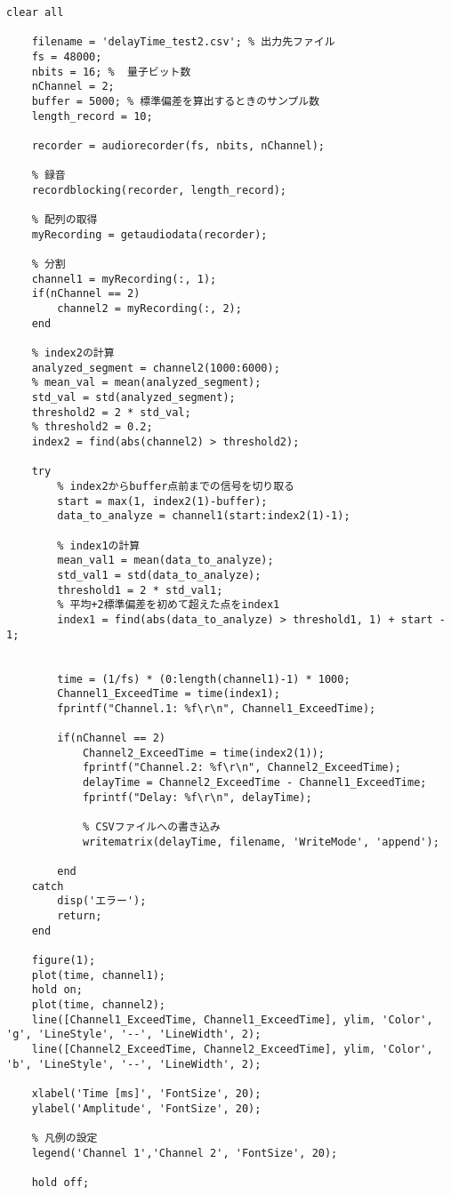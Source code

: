 \begin{lstlisting}[caption=MeasureDelayTime.m]
    clear all

    filename = 'delayTime_test2.csv'; % 出力先ファイル
    fs = 48000; 
    nbits = 16; %  量子ビット数
    nChannel = 2; 
    buffer = 5000; % 標準偏差を算出するときのサンプル数
    length_record = 10; 

    recorder = audiorecorder(fs, nbits, nChannel);

    % 録音
    recordblocking(recorder, length_record); 

    % 配列の取得
    myRecording = getaudiodata(recorder);

    % 分割
    channel1 = myRecording(:, 1);
    if(nChannel == 2)
        channel2 = myRecording(:, 2);
    end

    % index2の計算
    analyzed_segment = channel2(1000:6000);
    % mean_val = mean(analyzed_segment);
    std_val = std(analyzed_segment);
    threshold2 = 2 * std_val;
    % threshold2 = 0.2;
    index2 = find(abs(channel2) > threshold2); 

    try
        % index2からbuffer点前までの信号を切り取る
        start = max(1, index2(1)-buffer);  
        data_to_analyze = channel1(start:index2(1)-1);

        % index1の計算
        mean_val1 = mean(data_to_analyze);
        std_val1 = std(data_to_analyze);
        threshold1 = 2 * std_val1;
        % 平均+2標準偏差を初めて超えた点をindex1
        index1 = find(abs(data_to_analyze) > threshold1, 1) + start - 1;

        
        time = (1/fs) * (0:length(channel1)-1) * 1000;
        Channel1_ExceedTime = time(index1);
        fprintf("Channel.1: %f\r\n", Channel1_ExceedTime);

        if(nChannel == 2)
            Channel2_ExceedTime = time(index2(1));
            fprintf("Channel.2: %f\r\n", Channel2_ExceedTime);
            delayTime = Channel2_ExceedTime - Channel1_ExceedTime;
            fprintf("Delay: %f\r\n", delayTime);

            % CSVファイルへの書き込み
            writematrix(delayTime, filename, 'WriteMode', 'append');

        end
    catch
        disp('エラー');
        return;
    end

    figure(1); 
    plot(time, channel1);
    hold on;
    plot(time, channel2);
    line([Channel1_ExceedTime, Channel1_ExceedTime], ylim, 'Color', 'g', 'LineStyle', '--', 'LineWidth', 2);
    line([Channel2_ExceedTime, Channel2_ExceedTime], ylim, 'Color', 'b', 'LineStyle', '--', 'LineWidth', 2);
    
    xlabel('Time [ms]', 'FontSize', 20);  
    ylabel('Amplitude', 'FontSize', 20);  

    % 凡例の設定
    legend('Channel 1','Channel 2', 'FontSize', 20);

    hold off;

\end{lstlisting}
    